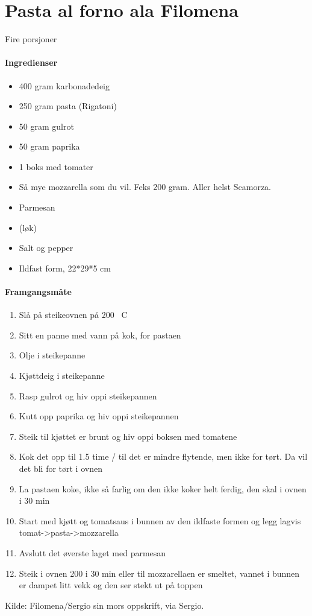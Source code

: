 \section{Pasta al forno ala Filomena}

Fire porsjoner

\paragraph{Ingredienser}
\begin{itemize}[noitemsep]
  \item 400 gram karbonadedeig
  \item 250 gram pasta (Rigatoni)
  \item 50 gram gulrot
  \item 50 gram paprika
  \item 1 boks med tomater
  \item Så mye mozzarella som du vil. Feks 200 gram. Aller helst Scamorza.
  \item Parmesan
  \item (løk)
  \item Salt og pepper
  \item Ildfast form, 22*29*5 cm
\end{itemize}

\paragraph{Framgangsmåte}
\begin{enumerate}[noitemsep]
  \item Slå på steikeovnen på 200 \degree~C
  \item Sitt en panne med vann på kok, for pastaen
  \item Olje i steikepanne
  \item Kjøttdeig i steikepanne
  \item Rasp gulrot og hiv oppi steikepannen
  \item Kutt opp paprika og hiv oppi steikepannen
  \item Steik til kjøttet er brunt og hiv oppi boksen med tomatene
  \item Kok det opp til 1.5 time / til det er mindre flytende, men ikke for tørt. Da vil det bli for tørt i ovnen
  \item La pastaen koke, ikke så farlig om den ikke koker helt ferdig, den skal i ovnen i 30 min
  \item Start med kjøtt og tomatsaus i bunnen av den ildfaste formen og legg lagvis tomat->pasta->mozzarella
  \item Avslutt det øverste laget med parmesan
  \item Steik i ovnen 200 i 30 min eller til mozzarellaen er smeltet, vannet i bunnen er dampet litt vekk og den ser stekt ut på toppen
\end{enumerate}


Kilde: Filomena/Sergio sin mors oppskrift, via Sergio.
